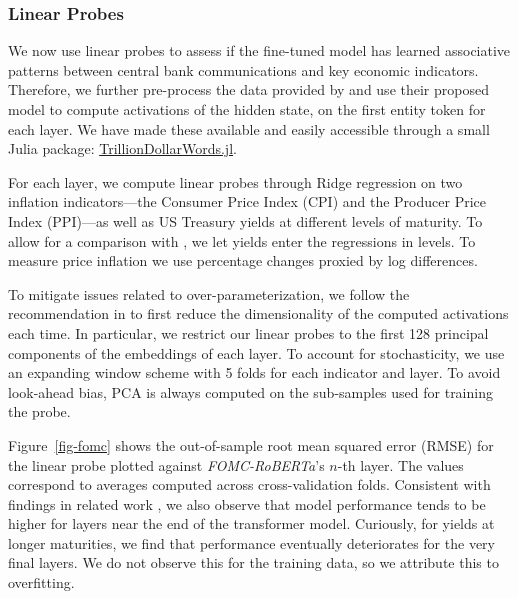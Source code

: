 \documentclass{article}
\theoremstyle{plain}
\theoremstyle{definition}
\theoremstyle{remark}
\begin{document}
\subsubsection{Linear Probes}\label{linear-probes}
We now use linear probes to assess if the fine-tuned model has learned associative patterns between central bank communications and key economic indicators. Therefore, we further pre-process the data provided by \citet{shah2023trillion} and use their proposed model to compute activations of the hidden state, on the first entity token for each layer. We have made these available and easily accessible through a small Julia package: \href{https://anonymous.4open.science/r/TrillionDollarWords/README.md}{TrillionDollarWords.jl}. 

For each layer, we compute linear probes through Ridge regression on two inflation indicators---the Consumer Price Index (CPI) and the Producer Price Index (PPI)---as well as US Treasury yields at different levels of maturity. To allow for a comparison with \citet{shah2023trillion}, we let yields enter the regressions in levels. To measure price inflation we use percentage changes proxied by log differences.

To mitigate issues related to over-parameterization, we follow the recommendation in \citet{alain2018understanding} to first reduce the dimensionality of the computed activations each time. In particular, we restrict our linear probes to the first 128 principal components of the embeddings of each layer.
To account for stochasticity, we use an expanding window scheme with 5 folds for each indicator and layer. To avoid look-ahead bias, PCA is always computed on the sub-samples used for training the probe. 

Figure~\ref{fig-fomc} shows the out-of-sample root mean squared error (RMSE) for the linear probe plotted against \emph{FOMC-RoBERTa}'s \(n\)-th layer. The values correspond to averages computed across cross-validation folds. Consistent with findings in related work \citep{alain2018understanding,gurnee2023languagev2}, we also observe that model performance tends to be higher for layers near the end of the transformer model. Curiously, for yields at longer maturities, we find that performance eventually deteriorates for the very final layers. We do not observe this for the training data, so we attribute this to overfitting. 
\end{document}
